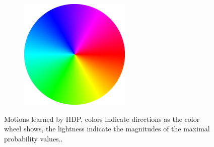 \begin{figure}
\begin{subfigure}{0.16\linewidth}
        \includegraphics[width=\linewidth]{./img/scene_learning/color_wheel.png}
    \end{subfigure}
    \caption{Motions learned by HDP, colors indicate directions as the color wheel shows, the lightness indicate the magnitudes of the maximal probability values..}
    \label{fig:scene-topics}
\end{figure}